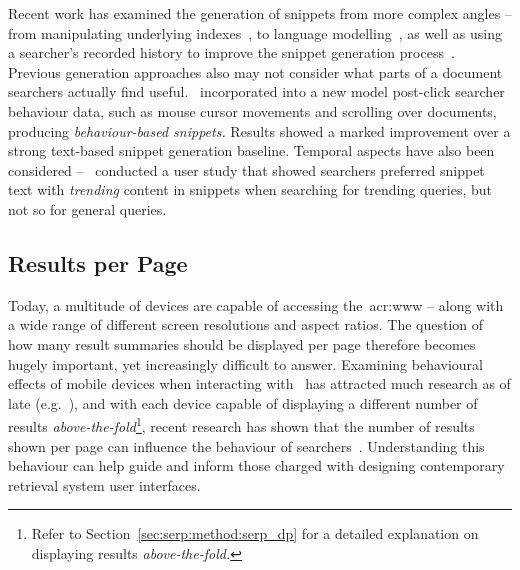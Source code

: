 Recent work has examined the generation of snippets from more complex angles -- from manipulating underlying indexes~\citep{turpin2007fast_snippets, bast2014snippet_generation}, to language modelling~\citep{li2010snippet_extraction, he2012bridging}, as well as using a searcher's recorded history to improve the snippet generation process~\citep{ageev2013summaries, savenkov2011search}. Previous generation approaches also may not consider what parts of a document searchers actually find useful.~\cite{ageev2013summaries} incorporated into a new model post-click searcher behaviour data, such as mouse cursor movements and scrolling over documents, producing \emph{behaviour-based snippets.} Results showed a marked improvement over a strong text-based snippet generation baseline. Temporal aspects have also been considered --~\cite{svore2012temporal_snippets} conducted a user study that showed searchers preferred snippet text with \emph{trending} content in snippets when searching for trending queries, but not so for general queries.

\subsection{Results per Page}
Today, a multitude of devices are capable of accessing the~\gls{acr:www} -- along with a wide range of different screen resolutions and aspect ratios. The question of how many result summaries should be displayed per page therefore becomes hugely important, yet increasingly difficult to answer. Examining behavioural effects of mobile devices when interacting with~ has attracted much research as of late (e.g.~\cite{kim2012small_vs_large, kim2014eye_tracking, kim2016pagination_versus_scrolling}), and with each device capable of displaying a different number of results \emph{above-the-fold}\footnote{Refer to Section~\ref{sec:serp:method:serp_dp} for a detailed explanation on displaying results \emph{above-the-fold.}}, recent research has shown that the number of results shown per page can influence the behaviour of searchers~\citep{joachims2005click_model, kim2014eye_tracking}. Understanding this behaviour can help guide and inform those charged with designing contemporary retrieval system user interfaces.

